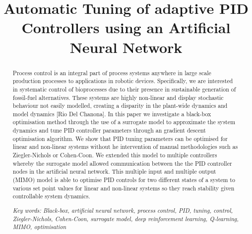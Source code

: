 \documentclass[conference]{IEEEtran}
\theoremstyle{definition}
\begin{document}
\title{Automatic Tuning of adaptive PID Controllers using an Artificial Neural Network}


\author{
}



\maketitle

\begin{abstract}
Process control is an integral part of process systems anywhere in large scale production processes to applications in robotic devices. Specifically, we are interested in systematic control of bioprocesses due to their presence in sustainable generation of fossil-fuel alternatives. These systems are highly non-linear and display stochastic behaviour not easily modelled, creating a disparity in the plant-wide dynamics and model dynamics [Rio Del Chanona]. In this paper we investigate a black-box optimisation method through the use of a surrogate model to approximate the system dynamics and tune PID controller parameters through an gradient descent optimisation algorithm. We show that PID tuning parameters can be optimised for linear and non-linear systems without he intervention of manual methodologies such as Ziegler-Nichols or Cohen-Coon. We extended this model to multiple controllers whereby the surrogate model allowed communication between the the PID controller nodes in the artificial neural network. This multiple input and multiple output (MIMO) model is able to optimise PID controls for two different states of a system to various set point values for linear and non-linear systems so they reach stability given controllable system dynamics. 

\noindent \textit{Key words: Black-box, artificial neural network, process control, PID, tuning, control, Ziegler-Nichols, Cohen-Coon, surrogate model, deep reinforcement learning, Q-learning, MIMO, optimisation}\end{abstract}

\IEEEpeerreviewmaketitle
\end{document}
